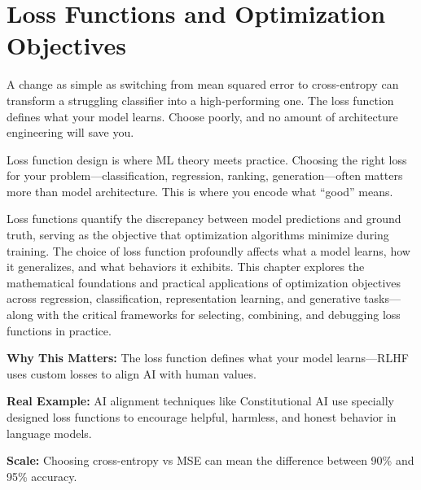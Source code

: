 \documentclass[../../main.tex]{subfiles}
\begin{document}
\chapter{Loss Functions and Optimization Objectives}
\label{ch:loss-functions}

A change as simple as switching from mean squared error to cross-entropy can transform a struggling classifier into a high-performing one. The loss function defines what your model learns. Choose poorly, and no amount of architecture engineering will save you.

\begin{whycare}
Loss function design is where ML theory meets practice. Choosing the right loss for your problem---classification, regression, ranking, generation---often matters more than model architecture. This is where you encode what ``good'' means.
\end{whycare}

\begin{keyconcept}
Loss functions quantify the discrepancy between model predictions and ground truth, serving as the objective that optimization algorithms minimize during training. The choice of loss function profoundly affects what a model learns, how it generalizes, and what behaviors it exhibits. This chapter explores the mathematical foundations and practical applications of optimization objectives across regression, classification, representation learning, and generative tasks---along with the critical frameworks for selecting, combining, and debugging loss functions in practice.
\end{keyconcept}

\begin{realworld}
\textbf{Why This Matters:} The loss function defines what your model learns---RLHF uses custom losses to align AI with human values.

\textbf{Real Example:} AI alignment techniques like Constitutional AI use specially designed loss functions to encourage helpful, harmless, and honest behavior in language models.

\textbf{Scale:} Choosing cross-entropy vs MSE can mean the difference between 90\% and 95\% accuracy.
\end{realworld}
\end{document}

